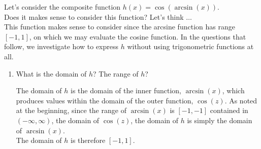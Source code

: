 \documentclass{ximera}
\begin{document}
\begin{example}

Let's consider the composite function $h(x) = \cos(\arcsin(x))$.  \\
Does it makes sense to consider this function? Let's think $\dots$ \\
This function makes sense to consider since the arcsine function has range $[-1,1]$, on which we may evaluate the cosine function. In the questions that follow, we investigate how to express $h$ without using trigonometric functions at all.%
\par
%
\begin{enumerate}

\item What is the domain of $h$?  The range of $h$? \\
%
\begin{explanation}
The domain of $h$ is the domain of the inner function, $\arcsin(x)$, which produces values within the domain of the outer function, $\cos(z)$. As noted at the beginning, since the range of $\arcsin(x)$ is $[-1,-1]$ contained in $(-\infty,\infty)$, the domain of $\cos(z)$, the domain of $h$ is simply the domain of $\arcsin(x)$. \\
The domain of $h$ is therefore $[-1,1]$.


\end{explanation}
\end{enumerate}
\end{example}
\end{document}

